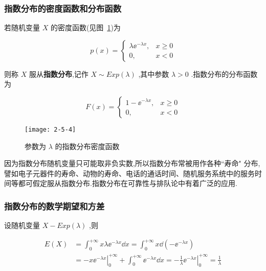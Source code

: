 \subsubsection{指数分布的密度函数和分布函数}

若随机变量 $ X $ 的密度函数(见图~\ref{fig:2.5.4})为

\begin{equation}
p(x)=\left\{\begin{array}{ll}
{\lambda \ee ^{-\lambda x},} & {x \geqslant 0} \\ 
{0,} & {x<0}
\end{array}\right. \label{eq:2.5.8}
\end{equation}

则称 $ X $ 服从\textbf{指数分布},记作 $ X \sim E x p(\lambda) $ ,其中参数 $ \lambda>0 $ .指数分布的分布函数为

\begin{equation}
F(x)=\left\{\begin{array}{ll}
{1-\ee ^{-\lambda x},} & {x \geqslant 0} \\ 
{0,} & {x<0}
\end{array}\right. \label{eq:2.5.9}
\end{equation}

\begin{figure}
	\centering
	\texttt{[image: 2-5-4]}
	\caption{参数为 $ \lambda $ 的指数分布密度函数}
	\label{fig:2.5.4}
\end{figure}

因为指数分布随机变量只可能取非负实数,所以指数分布常被用作各种``寿命"
分布,譬如电子元器件的寿命、动物的寿命、电话的通话时间、随机服务系统中的服务时间等都可假定服从指数分布.指数分布在可靠性与排队论中有着广泛的应用.

\subsubsection{指数分布的数学期望和方差}

设随机变量 $ X-E x p(\lambda) $ ,则

\[
\begin{aligned} 
E(X) &=\int_{0}^{+\infty} x \lambda \ee ^{-\lambda x} \dd x=\int_{0}^{+\infty} x \dd\left(-\ee ^{-\lambda x}\right) \\
&=-x\left.\ee ^{-\lambda x}\right|_{0} ^{+\infty}+\int_{0}^{+\infty} \ee ^{-\lambda x} \dd x=-\frac{1}{\lambda}\left.\ee ^{-\lambda x}\right|_{0} ^{+\infty}=\frac{1}{\lambda} 
\end{aligned}
\]

